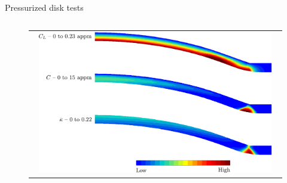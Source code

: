 \documentclass[9pt]{beamer}
\begin{document}
\begin{frame}{Pressurized disk tests}
\begin{columns}
        \begin{column}{0.55\textwidth}
            \begin{figure}
                \begin{tabular}{c}
                    \includegraphics[width=0.95\textwidth]{Images/fig_iso_values_disk.pdf}\\
                \end{tabular}
            \end{figure}
        \end{column}
    
    \end{columns}
    
\end{frame}

\end{document}
